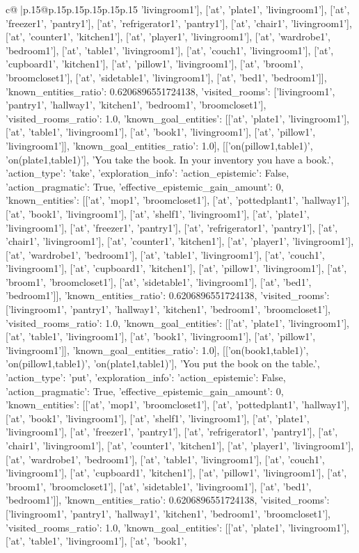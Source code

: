 \documentclass{article}
\begin{document}
{\begin{supertabular}{c@{$\;$}|p{.15\linewidth}@{}p{.15\linewidth}p{.15\linewidth}p{.15\linewidth}p{.15\linewidth}p{.15\linewidth}}
{{{'livingroom1'], ['at', 'plate1', 'livingroom1'], ['at', 'freezer1', 'pantry1'], ['at', 'refrigerator1', 'pantry1'], ['at', 'chair1', 'livingroom1'], ['at', 'counter1', 'kitchen1'], ['at', 'player1', 'livingroom1'], ['at', 'wardrobe1', 'bedroom1'], ['at', 'table1', 'livingroom1'], ['at', 'couch1', 'livingroom1'], ['at', 'cupboard1', 'kitchen1'], ['at', 'pillow1', 'livingroom1'], ['at', 'broom1', 'broomcloset1'], ['at', 'sidetable1', 'livingroom1'], ['at', 'bed1', 'bedroom1']], 'known_entities_ratio': 0.6206896551724138, 'visited_rooms': ['livingroom1', 'pantry1', 'hallway1', 'kitchen1', 'bedroom1', 'broomcloset1'], 'visited_rooms_ratio': 1.0, 'known_goal_entities': [['at', 'plate1', 'livingroom1'], ['at', 'table1', 'livingroom1'], ['at', 'book1', 'livingroom1'], ['at', 'pillow1', 'livingroom1']], 'known_goal_entities_ratio': 1.0}}], [['on(pillow1,table1)', 'on(plate1,table1)'], 'You take the book. In your inventory you have a book.', {'action_type': 'take', 'exploration_info': {'action_epistemic': False, 'action_pragmatic': True, 'effective_epistemic_gain_amount': 0, 'known_entities': [['at', 'mop1', 'broomcloset1'], ['at', 'pottedplant1', 'hallway1'], ['at', 'book1', 'livingroom1'], ['at', 'shelf1', 'livingroom1'], ['at', 'plate1', 'livingroom1'], ['at', 'freezer1', 'pantry1'], ['at', 'refrigerator1', 'pantry1'], ['at', 'chair1', 'livingroom1'], ['at', 'counter1', 'kitchen1'], ['at', 'player1', 'livingroom1'], ['at', 'wardrobe1', 'bedroom1'], ['at', 'table1', 'livingroom1'], ['at', 'couch1', 'livingroom1'], ['at', 'cupboard1', 'kitchen1'], ['at', 'pillow1', 'livingroom1'], ['at', 'broom1', 'broomcloset1'], ['at', 'sidetable1', 'livingroom1'], ['at', 'bed1', 'bedroom1']], 'known_entities_ratio': 0.6206896551724138, 'visited_rooms': ['livingroom1', 'pantry1', 'hallway1', 'kitchen1', 'bedroom1', 'broomcloset1'], 'visited_rooms_ratio': 1.0, 'known_goal_entities': [['at', 'plate1', 'livingroom1'], ['at', 'table1', 'livingroom1'], ['at', 'book1', 'livingroom1'], ['at', 'pillow1', 'livingroom1']], 'known_goal_entities_ratio': 1.0}}], [['on(book1,table1)', 'on(pillow1,table1)', 'on(plate1,table1)'], 'You put the book on the table.', {'action_type': 'put', 'exploration_info': {'action_epistemic': False, 'action_pragmatic': True, 'effective_epistemic_gain_amount': 0, 'known_entities': [['at', 'mop1', 'broomcloset1'], ['at', 'pottedplant1', 'hallway1'], ['at', 'book1', 'livingroom1'], ['at', 'shelf1', 'livingroom1'], ['at', 'plate1', 'livingroom1'], ['at', 'freezer1', 'pantry1'], ['at', 'refrigerator1', 'pantry1'], ['at', 'chair1', 'livingroom1'], ['at', 'counter1', 'kitchen1'], ['at', 'player1', 'livingroom1'], ['at', 'wardrobe1', 'bedroom1'], ['at', 'table1', 'livingroom1'], ['at', 'couch1', 'livingroom1'], ['at', 'cupboard1', 'kitchen1'], ['at', 'pillow1', 'livingroom1'], ['at', 'broom1', 'broomcloset1'], ['at', 'sidetable1', 'livingroom1'], ['at', 'bed1', 'bedroom1']], 'known_entities_ratio': 0.6206896551724138, 'visited_rooms': ['livingroom1', 'pantry1', 'hallway1', 'kitchen1', 'bedroom1', 'broomcloset1'], 'visited_rooms_ratio': 1.0, 'known_goal_entities': [['at', 'plate1', 'livingroom1'], ['at', 'table1', 'livingroom1'], ['at', 'book1', }}}
\end{supertabular}}
\end{document}
